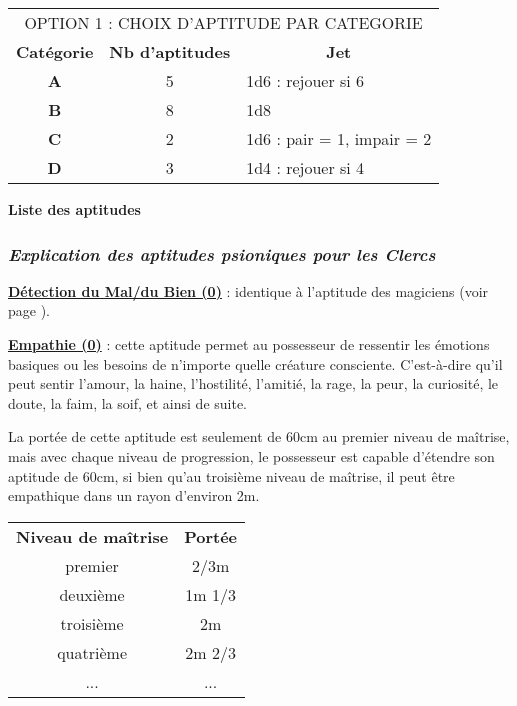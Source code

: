 \bigskip

\begin{tabular}{ccl}
\multicolumn{3}{c}{OPTION 1 : CHOIX D'APTITUDE PAR CATEGORIE} \\
\textbf{Catégorie} &  \textbf{Nb d'aptitudes} & \multicolumn{1}{c}{\textbf{Jet}} \\
\textbf{A} & 5 & 1d6 : rejouer si 6 \\
\textbf{B} & 8 & 1d8 \\
\textbf{C} & 2 & 1d6 : pair = 1, impair = 2 \\
\textbf{D} & 3 & 1d4 : rejouer si 4 \\
\end{tabular}

\bigskip

\textbf{Liste des aptitudes}

\bigskip


\subsubsection*{\textit{Explication des aptitudes psioniques pour les Clercs}}

\textbf{\uline{Détection du Mal/du Bien (0)}} : identique à l'aptitude des magiciens (voir page \pageref{magicien-detection-mal}).

\bigskip

\label{clerc-empathie}\textbf{\uline{Empathie (0)}} : cette aptitude permet au possesseur de ressentir les émotions basiques ou les besoins de n'importe quelle créature consciente. C'est-à-dire qu'il peut sentir l'amour, la haine, l'hostilité, l'amitié, la rage, la peur, la curiosité, le doute, la faim, la soif, et ainsi de suite.

\bigskip

La portée de cette aptitude est seulement de 60cm au premier niveau de maîtrise, mais avec chaque niveau de progression, le possesseur est capable d'étendre son aptitude de 60cm, si bien qu'au troisième niveau de maîtrise, il peut être empathique dans un rayon d'environ 2m.

\bigskip

\begin{tabular}{cc}
\textbf{Niveau de maîtrise} & \textbf{Portée}\\
premier     & 2/3m   \\
deuxième    & 1m 1/3   \\
troisième   & 2m  \\
quatrième   & 2m 2/3 \\
...         & ...    \\
\end{tabular}

